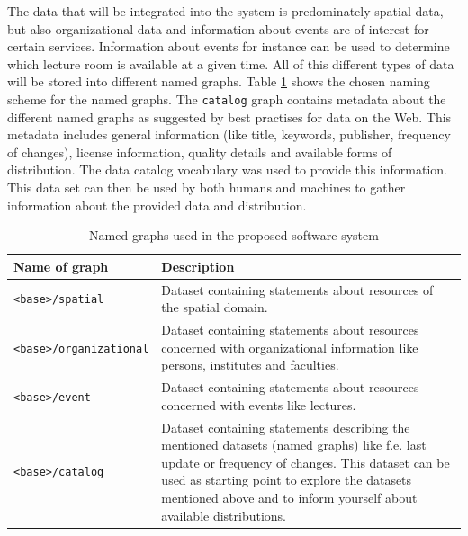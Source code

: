 \documentclass[draft,final]{vutinfth} %
\begin{document}
The data that will be integrated into the system is predominately spatial data, but also organizational data and information about events are of interest for certain services. Information about events for instance can be used to determine which lecture room is available at a given time. All of this different types of data will be stored into different named graphs. Table \ref{tab:architectural-prototype:named-graphs} shows the chosen naming scheme for the named graphs. The \texttt{catalog} graph contains metadata about the different named graphs as suggested by best practises for data on the Web\cite{w3c_data_2016}. This metadata includes general information (like title, keywords, publisher, frequency of changes), license information, quality details and available forms of distribution. The data catalog vocabulary\cite{maali_data_2014} was used to provide this information. This data set can then be used by both humans and machines to gather information about the provided data and distribution. 

\begin{table}
  \centering
  \begin{tabular}{p{}p{}}
    \toprule
    Name of graph & Description \\
    \midrule
    \texttt{<base>/spatial} & Dataset containing statements about resources of the spatial domain. \\
    \texttt{<base>/organizational} & Dataset containing statements about resources concerned with organizational information like persons, institutes and faculties. \\
    \texttt{<base>/event} & Dataset containing statements about resources concerned with events like lectures.\\
    \texttt{<base>/catalog} & Dataset containing statements describing the mentioned datasets (named graphs) like f.e. last update or frequency of changes. This dataset can be used as starting point to explore the datasets mentioned above and to inform yourself about available distributions.\\
    \bottomrule
  \end{tabular}
  \caption{Named graphs used in the proposed software system}
  \label{tab:architectural-prototype:named-graphs}
\end{table}
\end{document}
